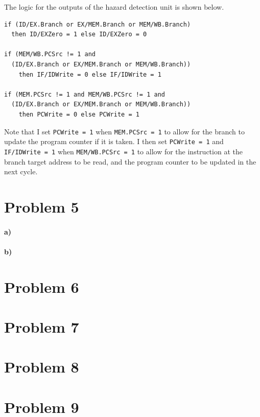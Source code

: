 \documentclass[12pt]{article}
\begin{document}
The logic for the outputs of the hazard detection unit is shown below.
\begin{verbatim}
if (ID/EX.Branch or EX/MEM.Branch or MEM/WB.Branch)
  then ID/EXZero = 1 else ID/EXZero = 0

if (MEM/WB.PCSrc != 1 and
  (ID/EX.Branch or EX/MEM.Branch or MEM/WB.Branch))
    then IF/IDWrite = 0 else IF/IDWrite = 1

if (MEM.PCSrc != 1 and MEM/WB.PCSrc != 1 and
  (ID/EX.Branch or EX/MEM.Branch or MEM/WB.Branch))
    then PCWrite = 0 else PCWrite = 1
\end{verbatim}
Note that I set \texttt{PCWrite = 1} when \texttt{MEM.PCSrc = 1} to allow for the branch to update the program counter if it is taken. I then
set \texttt{PCWrite = 1} and \texttt{IF/IDWrite = 1} when \texttt{MEM/WB.PCSrc = 1} to allow for the instruction at the branch target address to be read, and the
program counter to be updated in the next cycle.

\section*{Problem 5}

\paragraph{a)}

\paragraph{b)}

\section*{Problem 6}

\section*{Problem 7}

\section*{Problem 8}

\section*{Problem 9}
\end{document}
